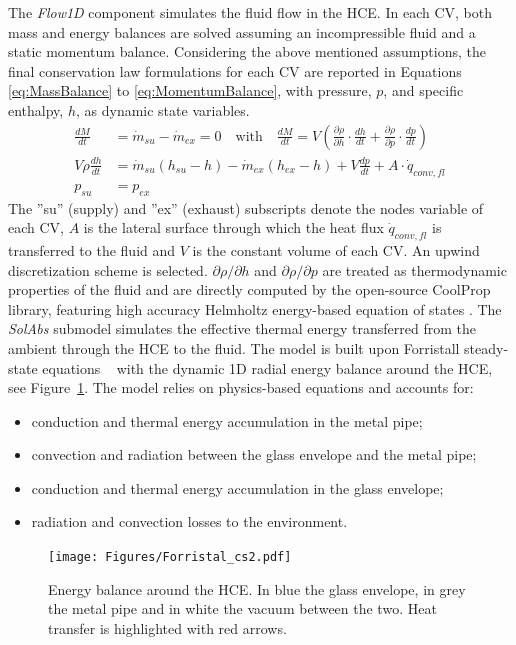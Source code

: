 \documentclass[final,3p,times,review]{elsarticle}
\begin{document}
The \textit{Flow1D} component simulates the fluid flow in the HCE. In each CV, both mass and energy balances are solved assuming an incompressible fluid and a static momentum balance. Considering the above mentioned assumptions, the final conservation law formulations for each CV are reported in Equations \ref{eq:MassBalance} to \ref{eq:MomentumBalance}, with pressure, $p$, and specific enthalpy, $h$, as dynamic state variables.
%
\begin{align}
\label{eq:MassBalance}
\frac{dM}{dt} & = \dot{m}_{su}-\dot{m}_{ex} = 0  \quad \text{with} \quad
\frac{dM}{dt} = V \left( \frac{\partial \rho}{\partial h}  \cdot \frac{dh}{dt} + \frac{\partial \rho}{\partial p} \cdot \frac{dp}{dt} \right) \\
\label{eq:EnergyBalance}
V\rho \frac{dh}{dt} & = \dot{m}_{su}(h_{su} - h) - \dot{m}_{ex}(h_{ex} - h) + V \frac{dp}{dt} + A \cdot \dot{q}_{conv,fl} \\
\label{eq:MomentumBalance}
p_{su} & = p_{ex} 
\end{align}
%
The ''su'' (supply) and ''ex'' (exhaust) subscripts denote the nodes variable of each CV, $A$ is the lateral surface through which the heat flux $\dot{q}_{conv,fl}$ is transferred to the fluid and $V$ is the constant volume of each CV. An upwind discretization scheme is selected.
$\partial \rho / \partial h$ and $\partial \rho / \partial p$ are treated as  thermodynamic properties of the fluid and are directly computed by the open-source CoolProp library, featuring high accuracy Helmholtz energy-based equation of states \cite{Bell_CoolProp_2013}.
The \textit{SolAbs} submodel simulates the effective thermal energy transferred from the ambient through the HCE to the fluid. The model is built upon Forristall steady-state equations ~\cite{Forristall2003} with the dynamic 1D radial energy balance around the HCE, see Figure~\ref{fig:Forristal_cs2}. The model relies on physics-based equations and accounts for:
%
\begin{itemize}
	\item conduction and thermal energy accumulation in the metal pipe;
	\item convection and radiation between the glass envelope and the metal pipe;
	\item conduction and thermal energy accumulation in the glass envelope;
	\item radiation and convection losses to the environment.
\end{itemize}
%
\begin{figure}[h!]
	\centering
	\texttt{[image: Figures/Forristal\_cs2.pdf]}
	\caption{Energy balance around the HCE. In blue the glass envelope, in grey the metal pipe and in white the vacuum between the two. Heat transfer is highlighted with red arrows.}
	\label{fig:Forristal_cs2}
\end{figure}
\end{document}
